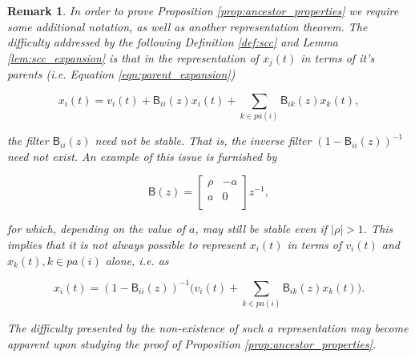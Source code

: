 \documentclass{statsoc}
\def\B{\mathsf{B}}  %
\def\H{\mathcal{H}}  %
\newcommand{\linE}[2]{\hat{\E}[#1\ |\ #2]}  %
\newcommand{\pa}[1]{pa(#1)}  %
\newcommand{\anc}[1]{\mathcal{A}(#1)}  %
\newtheorem{remark}{Remark}
\def\H{\mathcal{H}}  %
\def\E{\mathbb{E}}  %
\newcommand{\inner}[2]{\langle #1, #2 \rangle}  %
\begin{document}




\begin{remark}
  In order to prove Proposition \ref{prop:ancestor_properties} we
  require some additional notation, as well as another representation
  theorem.  The difficulty addressed by the following Definition
  \ref{def:scc} and Lemma \ref{lem:scc_expansion} is that in the
  representation of $x_j(t)$ in terms of it's parents (i.e. Equation
  \eqref{eqn:parent_expansion})

  \[
    x_i(t) = v_i(t) + \B_{ii}(z)x_i(t) + \sum_{k \in \pa{i}}\B_{ik}(z)x_k(t),
  \]

  the filter $\B_{ii}(z)$ need not be stable.  That is, the inverse
  filter $(1 - \B_{ii}(z))^{-1}$ need not exist.  An example of this
  issue is furnished by

  \[
    \B(z) = \left[
    \begin{array}{cc}
      \rho & -a\\
      a & 0\\
    \end{array}
  \right] z^{-1},
  \]

  for which, depending on the value of $a$, may still be stable even
  if $|\rho| > 1$.  This implies that it is not always possible to
  represent $x_i(t)$ in terms of $v_i(t)$ and $x_k(t), k \in \pa{i}$
  alone, i.e. as

  \[
    x_i(t) = (1 - \B_{ii}(z))^{-1}\big(v_i(t) + \sum_{k \in \pa{i}}\B_{ik}(z)x_k(t)\big).
  \]

  The difficulty presented by the non-existence of such a
  representation may become apparent upon studying the proof of
  Proposition \ref{prop:ancestor_properties}.
\end{remark}
\end{document}
